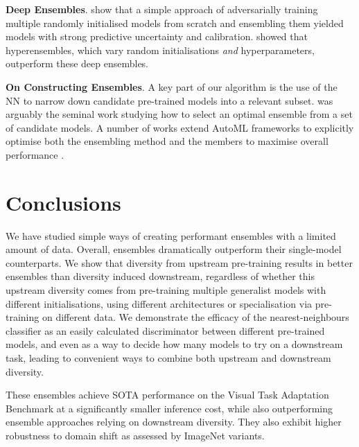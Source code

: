 \documentclass{article} \usepackage{iclr2021_conference,times}
\begin{document}
\textbf{Deep Ensembles}.
\citet{balaji2017ensembles} show that a simple approach of adversarially training multiple randomly initialised models from scratch and ensembling them yielded models with strong predictive uncertainty and calibration. \citet{wenzel2020hyperparameter} showed that hyperensembles, which vary random initialisations \emph{and} hyperparameters, outperform these deep ensembles. 

\textbf{On Constructing Ensembles}.
A key part of our algorithm is the use of the NN to narrow down candidate pre-trained models into a relevant subset. 
\citet{caruana2004ensembleselection} was arguably the seminal work studying how to select an optimal ensemble from a set of candidate models.
A number of works extend AutoML frameworks \citep{he2019automl} to explicitly optimise both the ensembling method and the members to maximise overall performance \citep{wistuba2017frankenstein, xavier2018ea}.

%
 

\vspace{-0.5em}
\section{Conclusions}
We have studied simple ways of creating performant ensembles with a limited amount of data.
Overall, ensembles dramatically outperform their single-model counterparts.
We show that diversity from upstream pre-training results in better ensembles than diversity induced downstream, regardless of whether this upstream diversity comes from pre-training multiple generalist models with different initialisations, using different architectures or specialisation via pre-training on different data. We demonstrate the efficacy of the nearest-neighbours classifier as an easily calculated discriminator between different pre-trained models, and even as a way to decide how many models to try on a downstream task, leading to convenient ways to combine both upstream and downstream diversity.

These ensembles achieve SOTA performance on the Visual Task Adaptation Benchmark at a significantly smaller inference cost, while also outperforming ensemble approaches relying on downstream diversity. They also exhibit higher robustness to domain shift as assessed by ImageNet variants.
\end{document}
